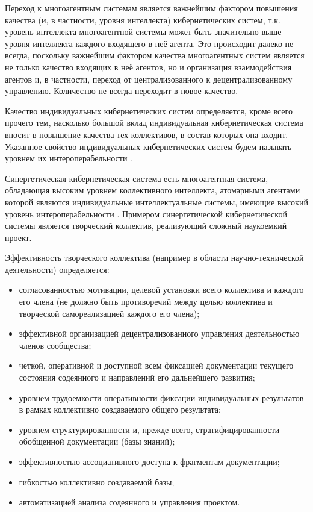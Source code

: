 Переход к многоагентным системам является важнейшим фактором повышения качества (и, в частности, уровня интеллекта) кибернетических систем, т.к. уровень интеллекта многоагентной системы может быть значительно выше уровня интеллекта каждого входящего в неё агента. 
Это происходит далеко не всегда, поскольку важнейшим фактором качества многоагентных систем является не только качество входящих в неё агентов, но и организация взаимодействия агентов и, в частности, переход от централизованного к децентрализованному управлению. 
Количество не всегда переходит в новое качество.

Качество индивидуальных кибернетических систем определяется, кроме всего прочего тем, насколько большой вклад индивидуальная кибернетическая система вносит в повышение качества тех коллективов, в состав которых она входит.
Указанное свойство индивидуальных кибернетических систем будем называть уровнем их интероперабельности \cite{Ouksel1999interoperability}.

Синергетическая кибернетическая система есть многоагентная система, обладающая высоким уровнем коллективного интеллекта, атомарными агентами которой являются индивидуальные интеллектуальные системы, имеющие высокий уровень интероперабельности \cite{Lopes2022semantic} \cite{Hamilton2006Interoperability}.
Примером синергетической кибернетической системы является творческий коллектив, реализующий сложный наукоемкий проект.

Эффективность творческого коллектива (например в области научно-технической деятельности) определяется:
\begin{itemize}
    \item{согласованностью мотивации, целевой установки всего коллектива и каждого его члена (не должно быть противоречий между целью коллектива и творческой самореализацией каждого его члена);}
    \item{эффективной организацией децентрализованного управления деятельностью членов сообщества;}
    \item{четкой, оперативной и доступной всем фиксацией документации текущего состояния содеянного и направлений его дальнейшего развития;}
    \item{уровнем трудоемкости оперативности фиксации индивидуальных результатов в рамках коллективно создаваемого общего результата;}
    \item{уровнем структурированности и, прежде всего, стратифицированности обобщенной документации (базы знаний);}
    \item{эффективностью ассоциативного доступа к фрагментам документации;}
    \item{гибкостью коллективно создаваемой базы;}
    \item{автоматизацией анализа содеянного и управления проектом.}
\end{itemize}

